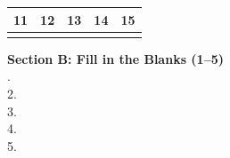 \documentclass{USTBExam}
\begin{document}
\begin{tabular}{|c|c|c|c|c|}
\hline
11 & 12 & 13 & 14 & 15 \\
\hline
\underline{\hspace{1.6cm}} & \underline{\hspace{1.6cm}} & \underline{\hspace{1.6cm}} & \underline{\hspace{1.6cm}} & \underline{\hspace{1.6cm}}  \\
\hline
\end{tabular}

\vspace{0.8cm}
\noindent\textbf{Section B: Fill in the Blanks (1--5)}\\[0.2cm]
.\ \underline{\hspace{17cm}}\\[0.4cm]
2.\ \underline{\hspace{17cm}}\\[0.4cm]
3.\ \underline{\hspace{17cm}}\\[0.4cm]
4.\ \underline{\hspace{17cm}}\\[0.4cm]
5.\ \underline{\hspace{17cm}}\\[0.4cm]
\end{document}
